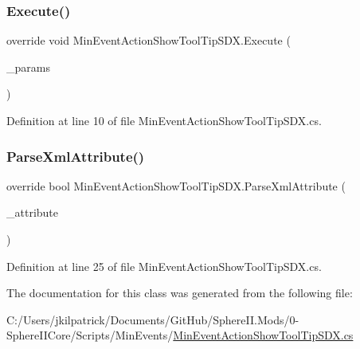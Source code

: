 \subsubsection{\texorpdfstring{Execute()}{Execute()}}
{\footnotesize\ttfamily override void Min\+Event\+Action\+Show\+Tool\+Tip\+S\+D\+X.\+Execute (\begin{DoxyParamCaption}\item[{Min\+Event\+Params}]{\+\_\+params }\end{DoxyParamCaption})}



Definition at line 10 of file Min\+Event\+Action\+Show\+Tool\+Tip\+S\+D\+X.\+cs.

\mbox{\label{class_min_event_action_show_tool_tip_s_d_x_a07a5eec000d2750a1f19132c192bbc4b}} 
\subsubsection{\texorpdfstring{ParseXmlAttribute()}{ParseXmlAttribute()}}
{\footnotesize\ttfamily override bool Min\+Event\+Action\+Show\+Tool\+Tip\+S\+D\+X.\+Parse\+Xml\+Attribute (\begin{DoxyParamCaption}\item[{Xml\+Attribute}]{\+\_\+attribute }\end{DoxyParamCaption})}



Definition at line 25 of file Min\+Event\+Action\+Show\+Tool\+Tip\+S\+D\+X.\+cs.



The documentation for this class was generated from the following file\+:\begin{DoxyCompactItemize}
\item 
C\+:/\+Users/jkilpatrick/\+Documents/\+Git\+Hub/\+Sphere\+I\+I.\+Mods/0-\/\+Sphere\+I\+I\+Core/\+Scripts/\+Min\+Events/\mbox{\hyperlink{_min_event_action_show_tool_tip_s_d_x_8cs}{Min\+Event\+Action\+Show\+Tool\+Tip\+S\+D\+X.\+cs}}\end{DoxyCompactItemize}
